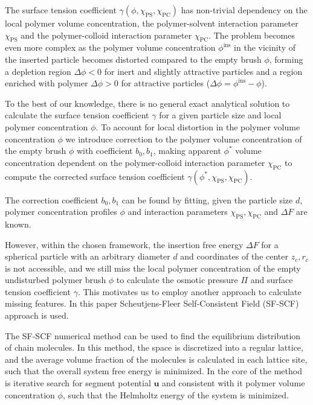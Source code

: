 \documentclass[10pt, a4paper]{article}
\begin{document}
\begin{multicols}{2}
The surface tension coefficient $\gamma(\phi, \chi_{\textrm{PS}}, \chi_{\textrm{PC}})$ has non-trivial dependency on the local polymer volume concentration, the polymer-solvent interaction parameter $\chi_{\textrm{PS}}$ and the polymer-colloid interaction parameter $\chi_{\textrm{PC}}$.
The problem becomes even more complex as the polymer volume concentration $\phi^{\textrm{ins}}$ in the vicinity of the inserted particle becomes distorted compared to the empty brush $\phi$, forming a depletion region $\Delta \phi <0$ for inert and slightly attractive particles and a region enriched with polymer $\Delta \phi >0$ for attractive particles ($\Delta \phi = \phi^{\textrm{ins}} - \phi$).

To the best of our knowledge, there is no general exact analytical solution to calculate the surface tension coefficient $\gamma$ for a given particle size and local polymer concentration $\phi$.
To account for local distortion in the polymer volume concentration $\phi$ we introduce correction to the polymer volume concentration of the empty brush $\phi$ with coefficient $b_0, b_1$, making apparent $\phi^{\ast}$ volume concentration dependent on the polymer-colloid interaction parameter $\chi_{\textrm{PC}}$ to compute the corrected surface tension coefficient $\gamma(\phi^{\ast},\chi_{\textrm{PS}}, \chi_{\textrm{PC}})$.

The correction coefficient $b_0, b_1$ can be found by fitting, given the particle size $d$, polymer concentration profiles $\phi$ and interaction parameters $\chi_{\textrm{PS}}, \chi_{\textrm{PC}}$ and $\Delta F$ are known.

However, within the chosen framework, the insertion free energy $\Delta F$ for a spherical particle with an arbitrary diameter $d$ and coordinates of the center $z_c, r_c$ is not accessible, and we still miss the local polymer concentration of the empty undisturbed polymer brush $\phi$ to calculate the osmotic pressure $\Pi$ and surface tension coefficient $\gamma$.
This motivates us to employ another approach to calculate missing features. 
In this paper Scheutjens-Fleer Self-Consistent Field (SF-SCF) approach is used.

The SF-SCF numerical method can be used to find the equilibrium distribution of chain molecules.
In this method, the space is discretized into a regular lattice, and the average volume fraction of the molecules is calculated in each lattice site, such that the overall system free energy is minimized.
In the core of the method is iterative search for segment potential $\mathbf{u}$ and consistent with it polymer volume concentration $\phi$, such that the Helmholtz energy of the system is minimized.


\end{multicols}
\end{document}
